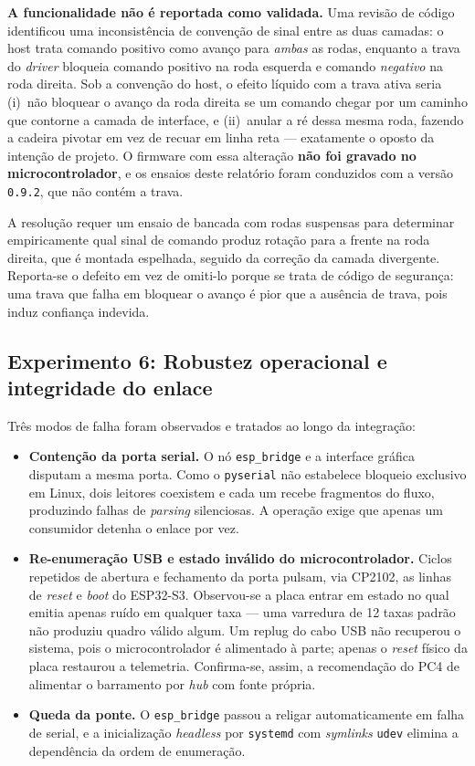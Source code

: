 \documentclass[conference]{IEEEtran}
\begin{document}
\textbf{A funcionalidade não é reportada como validada.} Uma revisão de código
identificou uma inconsistência de convenção de sinal entre as duas camadas: o
host trata comando positivo como avanço para \emph{ambas} as rodas, enquanto a
trava do \emph{driver} bloqueia comando positivo na roda esquerda e comando
\emph{negativo} na roda direita. Sob a convenção do host, o efeito líquido com a
trava ativa seria (i)~não bloquear o avanço da roda direita se um comando chegar
por um caminho que contorne a camada de interface, e (ii)~anular a ré dessa mesma
roda, fazendo a cadeira pivotar em vez de recuar em linha reta --- exatamente o
oposto da intenção de projeto. O firmware com essa alteração \textbf{não foi
gravado no microcontrolador}, e os ensaios deste relatório foram conduzidos com a
versão \texttt{0.9.2}, que não contém a trava.

A resolução requer um ensaio de bancada com rodas suspensas para determinar
empiricamente qual sinal de comando produz rotação para a frente na roda direita,
que é montada espelhada, seguido da correção da camada divergente. Reporta-se o
defeito em vez de omiti-lo porque se trata de código de segurança: uma trava que
falha em bloquear o avanço é pior que a ausência de trava, pois induz confiança
indevida.

\subsection{Experimento 6: Robustez operacional e integridade do enlace}

Três modos de falha foram observados e tratados ao longo da integração:

\begin{itemize}
\item \textbf{Contenção da porta serial.} O nó \texttt{esp\_bridge} e a interface
gráfica disputam a mesma porta. Como o \texttt{pyserial} não estabelece bloqueio
exclusivo em Linux, dois leitores coexistem e cada um recebe fragmentos do fluxo,
produzindo falhas de \emph{parsing} silenciosas. A operação exige que apenas um
consumidor detenha o enlace por vez.

\item \textbf{Re-enumeração USB e estado inválido do microcontrolador.} Ciclos
repetidos de abertura e fechamento da porta pulsam, via CP2102, as linhas de
\emph{reset} e \emph{boot} do ESP32-S3. Observou-se a placa entrar em estado no
qual emitia apenas ruído em qualquer taxa --- uma varredura de \num{12} taxas
padrão não produziu quadro válido algum. Um replug do cabo USB não recuperou o
sistema, pois o microcontrolador é alimentado à parte; apenas o \emph{reset}
físico da placa restaurou a telemetria. Confirma-se, assim, a recomendação do PC4
de alimentar o barramento por \emph{hub} com fonte própria.

\item \textbf{Queda da ponte.} O \texttt{esp\_bridge} passou a religar
automaticamente em falha de serial, e a inicialização \emph{headless} por
\texttt{systemd} com \emph{symlinks} \texttt{udev} elimina a dependência da ordem
de enumeração.
\end{itemize}
\end{document}
